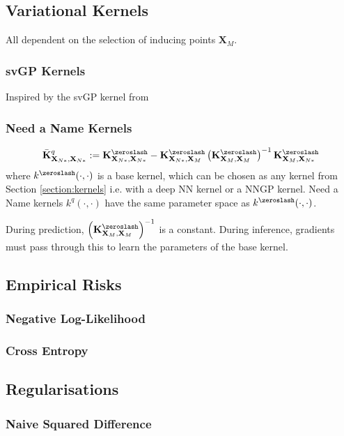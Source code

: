 \documentclass{article}
\numberwithin{equation}{section}
\begin{document}
\subsection{Variational Kernels}
All dependent on the selection of inducing points $\mathbf{X}_M$. 


\subsubsection{svGP Kernels}
Inspired by the svGP kernel from \cite{titsias2009variational}
\subsubsection{Need a Name Kernels}
\begin{align}
            \bar{\mathbf{K}}^q_{\mathbf{X}_{N*}, \mathbf{X}_{N*}} := \mathbf{K}^{\zeroslash}_{\mathbf{X}_{N*}, \mathbf{X}_{N*}} - \mathbf{K}^{\zeroslash}_{\mathbf{X}_{N*}, \mathbf{X}_M} \left( \mathbf{K}^{\zeroslash}_{\mathbf{X}_M, \mathbf{X}_M} \right)^{-1} \mathbf{K}^{\zeroslash}_{\mathbf{X}_M, \mathbf{X}_{N*}}
\end{align}
where $k^{\zeroslash}(\cdot, \cdot)$ is a base kernel, which can be chosen as any kernel from Section \ref{section:kernels} i.e. with a deep NN kernel or a NNGP kernel. Need a Name kernels $k^q(\cdot, \cdot)$ have the same parameter space as $k^{\zeroslash}(\cdot, \cdot)$.

During prediction, $\left( \mathbf{K}^{\zeroslash}_{\mathbf{X}_M, \mathbf{X}_M} \right)^{-1}$ is a constant. During inference, gradients must pass through this to learn the parameters of the base kernel.

\subsection{Empirical Risks}
\subsubsection{Negative Log-Likelihood}
\subsubsection{Cross Entropy}
\subsection{Regularisations}
\subsubsection{Naive Squared Difference}
\end{document}
